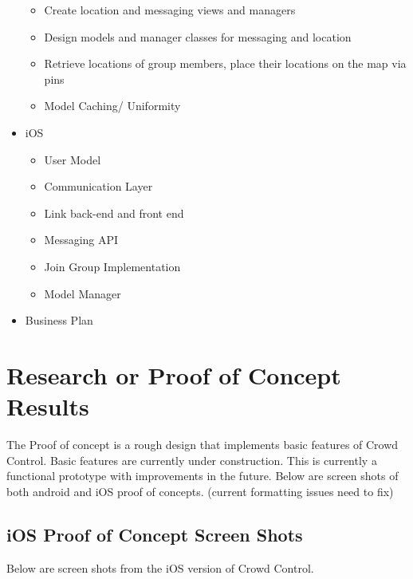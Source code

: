 \begin{itemize}
\begin{itemize}
	\item Create location and messaging views and managers
	\item Design models and manager classes for messaging and location
	\item Retrieve locations of group members, place their locations on the map via pins
	\item Model Caching/ Uniformity
\end{itemize}
\item iOS
\begin{itemize}
	\item User Model
	\item Communication Layer
	\item Link back-end and front end
	\item Messaging API
	\item Join Group Implementation
	\item Model Manager
\end{itemize}
\item Business Plan
\end{itemize}
\section{Research or Proof of Concept Results}


The Proof of concept is a rough design that implements basic features of Crowd Control. Basic features are currently under construction. This is currently a functional prototype with improvements in the future.
\newline 
\newline
Below are screen shots of both android and iOS proof of concepts.
(current formatting issues need to fix)
\subsection{iOS Proof of Concept Screen Shots}

Below are screen shots from the iOS version of Crowd Control.


